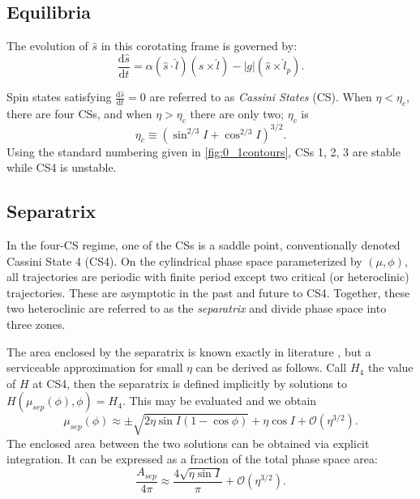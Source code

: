 \documentclass[
        fleqn,
        usenatbib,
    ]{mnras}
\newcommand*{\rd}[2]{\frac{\mathrm{d}#1}{\mathrm{d}#2}}
\newcommand*{\abs}[1]{\left|#1\right|}
\newcommand*{\p}[1]{\left(#1\right)}
\begin{document}
\subsection{Equilibria}

The evolution of $\hat{s}$ in this corotating frame is governed by:
\begin{equation}
    \rd{\hat{s}}{t} = \alpha \p{\hat{s} \cdot \hat{l}}
            \p{\hat{s} \times \hat{l}}
        - \abs{g}\p{\hat{s} \times \hat{l}_p}.
        \label{eq:dsdt_base}
\end{equation}

Spin states satisfying $\rd{\hat{s}}{t} = 0$ are referred to as \emph{Cassini
States} (CS). When $\eta < \eta_c$, there are four CSs, and when $\eta > \eta_c$
there are only two; $\eta_c$ is
\begin{equation}
    \eta_c \equiv \p{\sin^{2/3}I + \cos^{2/3}I}^{3/2}.
\end{equation}
Using the standard numbering given in \autoref{fig:0_1contours}, CSs 1, 2, 3 are
stable while CS4 is unstable.

\subsection{Separatrix}

In the four-CS regime, one of the CSs is a saddle point, conventionally denoted
Cassini State 4 (CS4). On the cylindrical phase space parameterized by $(\mu,
\phi)$, all trajectories are periodic with finite period except two critical (or
heteroclinic) trajectories. These are asymptotic in the past and future to CS4.
Together, these two heteroclinic are referred to as the \emph{separatrix} and
divide phase space into three zones.

The area enclosed by the separatrix is known exactly in literature
\citep{henrard1987}, but a serviceable approximation for small $\eta$ can be
derived as follows. Call $H_4$ the value of $H$ at CS4, then the separatrix is
defined implicitly by solutions to $H\p{\mu_{sep}(\phi), \phi} = H_4$. This may
be evaluated and we obtain
\begin{equation}
    \mu_{sep}(\phi) \approx \pm \sqrt{2\eta \sin I \p{1 - \cos \phi}}
        + \eta \cos I + \mathcal{O}\p{\eta^{3/2}}.\label{eq:mu_sep}
\end{equation}
The enclosed area between the two solutions can be obtained via explicit
integration. It can be expressed as a fraction of the total phase space area:
\begin{equation}
    \frac{A_{sep}}{4\pi} \approx \frac{4\sqrt{\eta \sin I}}{\pi}
        + \mathcal{O}\p{\eta^{3/2}}.\label{eq:a_sep}
\end{equation}
\end{document}
